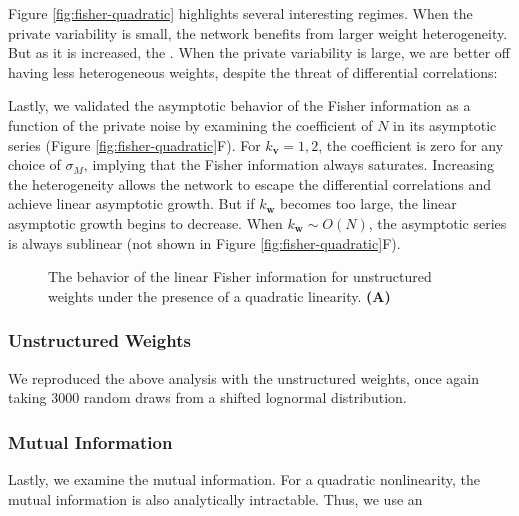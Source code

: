 \documentclass[11pt]{article}
\begin{document}
	Figure \ref{fig:fisher-quadratic} highlights several interesting regimes. When the private variability is small, the network benefits from larger weight heterogeneity. But as it is increased, the . When the private variability is large, we are better off having less heterogeneous weights, despite the threat of differential correlations: 
	
	Lastly, we validated the asymptotic behavior of the Fisher information as a function of the private noise by examining the coefficient of $N$ in its asymptotic series (Figure \ref{fig:fisher-quadratic}F). For $k_{\mathbf{v}}=1,2$, the coefficient is zero for any choice of $\sigma_M$, implying that the Fisher information always saturates. Increasing the heterogeneity allows the network to escape the differential correlations and achieve linear asymptotic growth. But if $k_{\mathbf{w}}$ becomes too large, the linear asymptotic growth begins to decrease. When $k_{\mathbf{w}}\sim O(N)$, the asymptotic series is always sublinear (not shown in Figure \ref{fig:fisher-quadratic}F).
	
	\begin{figure}[t]
		\centering
		\caption{The behavior of the linear Fisher information for unstructured weights under the presence of a quadratic linearity. \textbf{(A)} } 
	\end{figure}
	\subsubsection{Unstructured Weights}
	We reproduced the above analysis with the unstructured weights, once again taking 3000 random draws from a shifted lognormal distribution. 
	
	\subsubsection{Mutual Information}
	Lastly, we examine the mutual information. For a quadratic nonlinearity, the mutual information is also analytically intractable. Thus, we use an 
\end{document}
